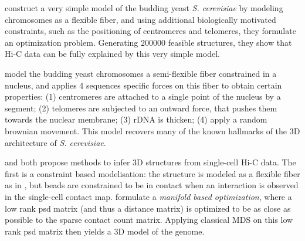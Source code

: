 \citet{tjong:physical} construct a very simple model of the budding yeast
{\em S. cerevisiae} by modeling chromosomes
as a flexible fiber, and using additional biologically motivated constraints,
such as the positioning of centromeres and telomeres, they formulate an
optimization problem. Generating $200000$ feasible structures, they show that
Hi-C data can be fully explained by this very simple model.

\citet{wong:how} model the budding yeast chromosomes a semi-flexible fiber
constrained in a nucleus, and applies 4 sequences specific forces on this
fiber to obtain certain properties: (1) centromeres are attached to a single
point of the nucleus by a segment; (2) telomeres are subjected to an outward
force, that pushes them towards the nuclear membrane; (3) rDNA is thicken; (4)
apply a random brownian movement. This model recovers many of the known
hallmarks of the 3D architecture of {\em S. cerevisiae}.

\citet{nagano:single-cell} and \citet{paulsen:manifold} both propose methods
to infer 3D structures from single-cell Hi-C data. The first is a constraint
based modelisation: the structure is modeled as a flexible fiber as in
\citet{tjong:physical}, but beads are constrained to be in contact when an
interaction is observed in the single-cell contact map.
\citet{paulsen:manifold} formulate a \textit{manifold based optimization},
where a low rank psd matrix (and thus a distance matrix) is optimized to be as
close as possible to the sparse contact count matrix. Applying classical MDS
on this low rank psd matrix then yields a 3D model of the genome.

